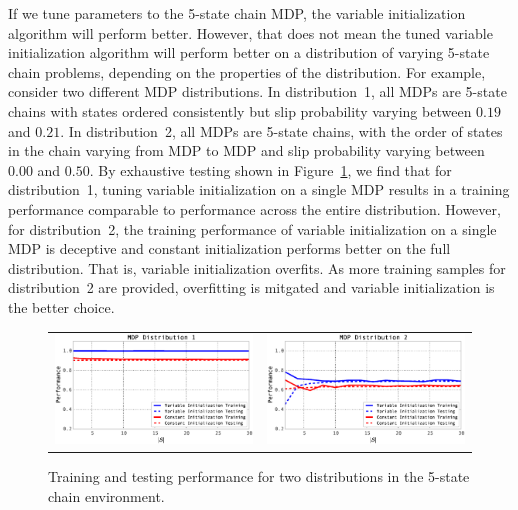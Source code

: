 If we tune parameters to the 5-state chain MDP, the variable initialization algorithm will perform better. However, that does not mean the tuned variable initialization algorithm will perform better on a distribution of varying 5-state chain problems, depending on the properties of the distribution. For example, consider two different MDP distributions. In distribution~1, all MDPs are 5-state chains with states ordered consistently but slip probability varying between $0.19$ and $0.21$. In distribution~2, all MDPs are 5-state chains, with the order of states in the chain varying from MDP to MDP and slip probability varying between $0.00$ and $0.50$. By exhaustive testing shown in Figure~\ref{fig:underfit}, we find that for distribution~1, tuning variable initialization on a single MDP results in a training performance comparable to performance across the entire distribution. However, for distribution~2, the training performance of variable initialization on a single MDP is deceptive and constant initialization performs better on the full distribution. That is, variable initialization overfits. %
As more training samples for distribution~2 are provided, overfitting is mitgated and variable initialization
is the better choice.
\begin{figure}
\centering
\begin{tabular}{cc}
\includegraphics[width=.4\columnwidth]{images/mdp_distribution1} &
\includegraphics[width=.4\columnwidth]{images/mdp_distribution2}
\end{tabular}
\caption{Training and testing performance for two distributions in the 5-state chain environment.} %
\label{fig:underfit}
\end{figure}

